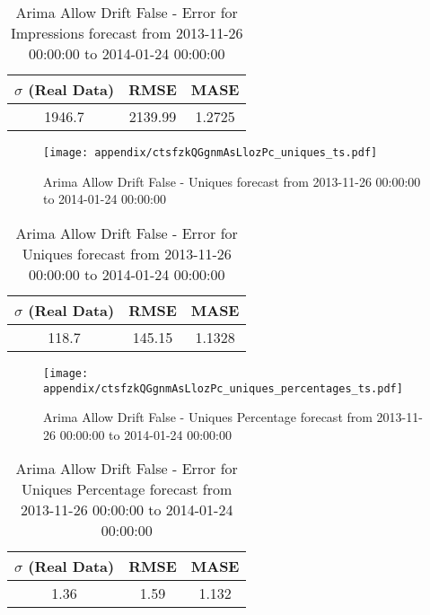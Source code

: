\begin{table}[H]
\centering
\footnotesize
\begin{tabular}{ccc}
$\sigma$ (Real Data) & RMSE & MASE   \\ \hline
1946.7 & 2139.99 & 1.2725 \\
\end{tabular}

\vspace{0.5cm}

\caption{
Arima Allow Drift False - Error for Impressions forecast from 2013-11-26 00:00:00 to 2014-01-24 00:00:00}
\end{table}

\begin{figure}[H] \begin{center} \leavevmode
\texttt{[image: appendix/ctsfzkQGgnmAsLlozPc\_uniques\_ts.pdf]} \caption{
Arima Allow Drift False - Uniques forecast from 2013-11-26 00:00:00 to 2014-01-24 00:00:00} \label{fig:appendix/ctsfzkQGgnmAsLlozPc_uniques_ts.pdf} \end{center}
\end{figure}

\begin{table}[H]
\centering
\footnotesize
\begin{tabular}{ccc}
$\sigma$ (Real Data) & RMSE & MASE   \\ \hline
118.7 & 145.15 & 1.1328 \\
\end{tabular}

\vspace{0.5cm}

\caption{
Arima Allow Drift False - Error for Uniques forecast from 2013-11-26 00:00:00 to 2014-01-24 00:00:00}
\end{table}

\begin{figure}[H] \begin{center} \leavevmode
\texttt{[image: appendix/ctsfzkQGgnmAsLlozPc\_uniques\_percentages\_ts.pdf]} \caption{
Arima Allow Drift False - Uniques Percentage forecast from 2013-11-26 00:00:00 to 2014-01-24 00:00:00} \label{fig:appendix/ctsfzkQGgnmAsLlozPc_uniques_percentages_ts.pdf} \end{center}
\end{figure}

\begin{table}[H]
\centering
\footnotesize
\begin{tabular}{ccc}
$\sigma$ (Real Data) & RMSE & MASE   \\ \hline
1.36 & 1.59 & 1.132 \\
\end{tabular}

\vspace{0.5cm}

\caption{
Arima Allow Drift False - Error for Uniques Percentage forecast from 2013-11-26 00:00:00 to 2014-01-24 00:00:00}
\end{table}


